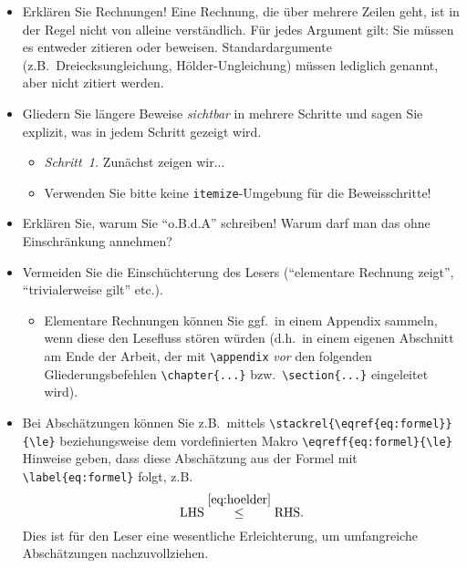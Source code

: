 \begin{itemize}
  \item Erklären Sie Rechnungen! Eine Rechnung, die über mehrere Zeilen geht, ist in der Regel nicht von alleine verständlich. Für jedes Argument gilt: Sie müssen es entweder zitieren oder beweisen. Standardargumente (z.B.\ Dreiecksungleichung, H\"older-Ungleichung) müssen lediglich genannt, aber nicht zitiert werden.

  \item Gliedern Sie längere Beweise \emph{sichtbar} in mehrere Schritte und sagen Sie explizit, was in jedem Schritt gezeigt wird.
        \begin{itemize}
          \item \emph{Schritt~1.} Zunächst zeigen wir...
          \item Verwenden Sie bitte keine \verb$itemize$-Umgebung für die Beweisschritte!
        \end{itemize}

  \item Erklären Sie, warum Sie "`o.B.d.A"' schreiben! Warum darf man das ohne Einschrän\-kung annehmen?

  \item Vermeiden Sie die Einschüchterung des Lesers ("`elementare Rechnung zeigt"', "`trivialerweise gilt"' etc.).
        \begin{itemize}
          \item Elementare Rechnungen können Sie ggf.\ in einem Appendix sammeln, wenn diese den Lesefluss stören würden (d.h.\ in einem eigenen Abschnitt am Ende der Arbeit, der mit \verb$\appendix$ \emph{vor} den folgenden Gliederungsbefehlen \verb$\chapter{...}$ bzw.\ \verb$\section{...}$ eingeleitet wird).
        \end{itemize}

  \item Bei Abschätzungen können Sie z.B.\ mittels \verb$\stackrel{\eqref{eq:formel}}{\le}$ beziehungsweise dem vordefinierten Makro \verb$\eqreff{eq:formel}{\le}$ Hinweise geben, dass diese Abschätzung aus der Formel mit \verb$\label{eq:formel}$ folgt, z.B.
        \begin{equation*}
          \textup{LHS} \eqreff{eq:hoelder}{\le} \textup{RHS}.
        \end{equation*}
        Dies ist für den Leser eine wesentliche Erleichterung, um umfangreiche Abschätzungen nachzuvollziehen.


\end{itemize}
